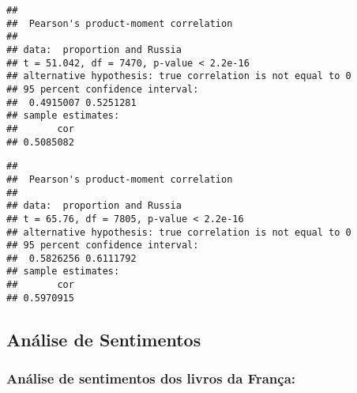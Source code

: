 \documentclass[]{article}
\newenvironment{Shaded}{\begin{snugshade}}{\end{snugshade}}
\newcommand{\DataTypeTok}[1]{\textcolor[rgb]{0.13,0.29,0.53}{#1}}
\newcommand{\KeywordTok}[1]{\textcolor[rgb]{0.13,0.29,0.53}{\textbf{#1}}}
\newcommand{\NormalTok}[1]{#1}
\newcommand{\OperatorTok}[1]{\textcolor[rgb]{0.81,0.36,0.00}{\textbf{#1}}}
\newcommand{\StringTok}[1]{\textcolor[rgb]{0.31,0.60,0.02}{#1}}
\begin{document}
\begin{Shaded}
\end{Shaded}

\begin{verbatim}
## 
##  Pearson's product-moment correlation
## 
## data:  proportion and Russia
## t = 51.042, df = 7470, p-value < 2.2e-16
## alternative hypothesis: true correlation is not equal to 0
## 95 percent confidence interval:
##  0.4915007 0.5251281
## sample estimates:
##       cor 
## 0.5085082
\end{verbatim}

\begin{Shaded}
\end{Shaded}

\begin{verbatim}
## 
##  Pearson's product-moment correlation
## 
## data:  proportion and Russia
## t = 65.76, df = 7805, p-value < 2.2e-16
## alternative hypothesis: true correlation is not equal to 0
## 95 percent confidence interval:
##  0.5826256 0.6111792
## sample estimates:
##       cor 
## 0.5970915
\end{verbatim}

\hypertarget{analise-de-sentimentos}{%
\subsection{Análise de Sentimentos}\label{analise-de-sentimentos}}

\hypertarget{analise-de-sentimentos-dos-livros-da-franca}{%
\subsubsection{Análise de sentimentos dos livros da
França:}\label{analise-de-sentimentos-dos-livros-da-franca}}
\end{document}
